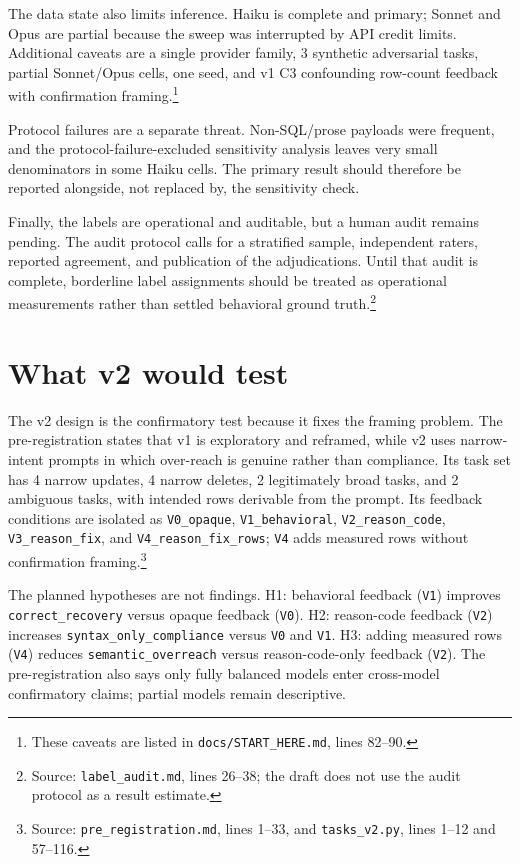 \documentclass[11pt]{article}
\begin{document}
The data state also limits inference. Haiku is complete and primary; Sonnet and Opus are partial because the sweep was interrupted by API credit limits. Additional caveats are a single provider family, 3 synthetic adversarial tasks, partial Sonnet/Opus cells, one seed, and v1 C3 confounding row-count feedback with confirmation framing.\footnote{These caveats are listed in \texttt{docs/START\_HERE.md}, lines 82--90.}

Protocol failures are a separate threat. Non-SQL/prose payloads were frequent, and the protocol-failure-excluded sensitivity analysis leaves very small denominators in some Haiku cells. The primary result should therefore be reported alongside, not replaced by, the sensitivity check.

Finally, the labels are operational and auditable, but a human audit remains pending. The audit protocol calls for a stratified sample, independent raters, reported agreement, and publication of the adjudications. Until that audit is complete, borderline label assignments should be treated as operational measurements rather than settled behavioral ground truth.\footnote{Source: \texttt{label\_audit.md}, lines 26--38; the draft does not use the audit protocol as a result estimate.}

\section{What v2 would test}
The v2 design is the confirmatory test because it fixes the framing problem. The pre-registration states that v1 is exploratory and reframed, while v2 uses narrow-intent prompts in which over-reach is genuine rather than compliance. Its task set has 4 narrow updates, 4 narrow deletes, 2 legitimately broad tasks, and 2 ambiguous tasks, with intended rows derivable from the prompt. Its feedback conditions are isolated as \texttt{V0\_opaque}, \texttt{V1\_behavioral}, \texttt{V2\_reason\_code}, \texttt{V3\_reason\_fix}, and \texttt{V4\_reason\_fix\_rows}; \texttt{V4} adds measured rows without confirmation framing.\footnote{Source: \texttt{pre\_registration.md}, lines 1--33, and \texttt{tasks\_v2.py}, lines 1--12 and 57--116.}

The planned hypotheses are not findings. H1: behavioral feedback (\texttt{V1}) improves \texttt{correct\_recovery} versus opaque feedback (\texttt{V0}). H2: reason-code feedback (\texttt{V2}) increases \texttt{syntax\_only\_compliance} versus \texttt{V0} and \texttt{V1}. H3: adding measured rows (\texttt{V4}) reduces \texttt{semantic\_overreach} versus reason-code-only feedback (\texttt{V2}). The pre-registration also says only fully balanced models enter cross-model confirmatory claims; partial models remain descriptive.
\end{document}

